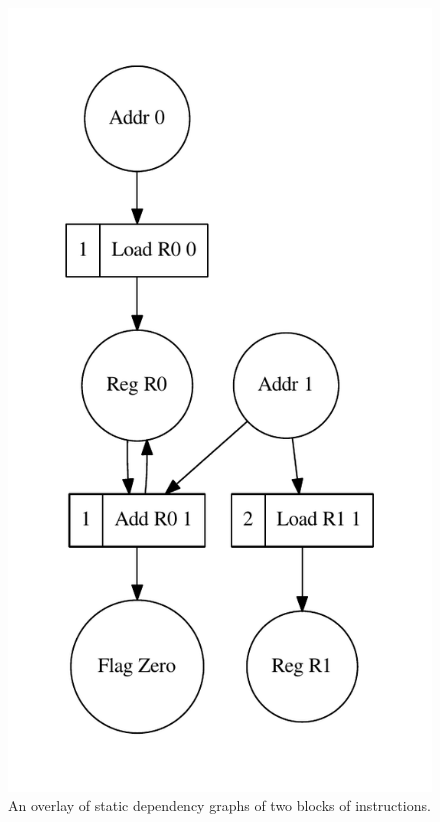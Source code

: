 \begin{figure}
\vspace{-6mm}
\centerline{\includegraphics[scale=0.6]{img/oracle2.pdf}}
\vspace{-6mm}
\caption{An overlay of static dependency graphs of two blocks of instructions.\label{fig-example-graph}}
\vspace{-6mm}
\end{figure}
